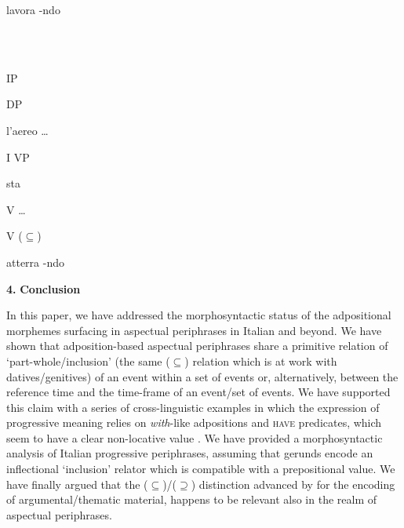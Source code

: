 \documentclass[output=paper]{langsci/langscibook}
\begin{document}
                                           lavora                {}-ndo   

\ea%
    \label{ex:key:31}
    \gll\\
        \\
    \glt
    \z

                                                IP

                               

                            DP 

                          l’aereo                                    …

                                             I                          VP

                                           sta

                                                          V                          …

                                                   

                                              V                      (${\subseteq}$)

                                           atterra                {}-ndo   

\textbf{4.} \textbf{Conclusion} 

In this paper, we have addressed the morphosyntactic status of the adpositional morphemes surfacing in aspectual periphrases in Italian and beyond. We have shown that adposition-based aspectual periphrases share a primitive relation of ‘part-whole/inclusion’ (the same (${\subseteq}$) relation which is at work with datives/genitives) of an event within a set of events or, alternatively, between the reference time and the time-frame of an event/set of events. We have supported this claim with a series of cross-linguistic examples in which the expression of progressive meaning relies on \textit{with}{}-like adpositions and \textsc{have} predicates, which seem to have a clear non-locative value \citep{Levinson2011}. We have provided a morphosyntactic analysis of Italian progressive periphrases, assuming that gerunds encode an inflectional ‘inclusion’ relator which is compatible with  a prepositional value. We have finally argued that the (${\subseteq}$)/(${\supseteq}$) distinction advanced by \citet{FrancoManzini2017b} for the encoding of argumental/thematic material, happens to be relevant also in the realm of aspectual periphrases.
\end{document}
